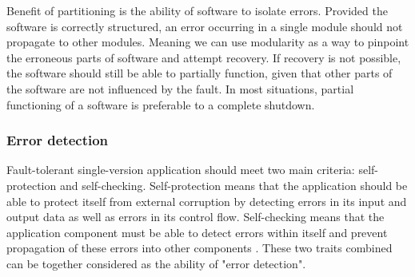 


Benefit of partitioning is the ability of software to isolate errors. Provided the software is correctly structured, an error occurring in a single module should not propagate to other modules. Meaning we can use modularity as a way to pinpoint the erroneous parts of software and attempt recovery. If recovery is not possible, the software should still be able to partially function, given that other parts of the software are not influenced by the fault. In most situations, partial functioning of a software is preferable to a complete shutdown.

\subsubsection{Error detection}

Fault-tolerant single-version application should meet two main criteria: self-protection and self-checking. Self-protection means that the application should be able to protect itself from external corruption by detecting errors in its input and output data as well as errors in its control flow. Self-checking means that the application component must be able to detect errors within itself and prevent propagation of these errors into other components \cite{nasa:sft}. These two traits combined can be together considered as the ability of "error detection".

